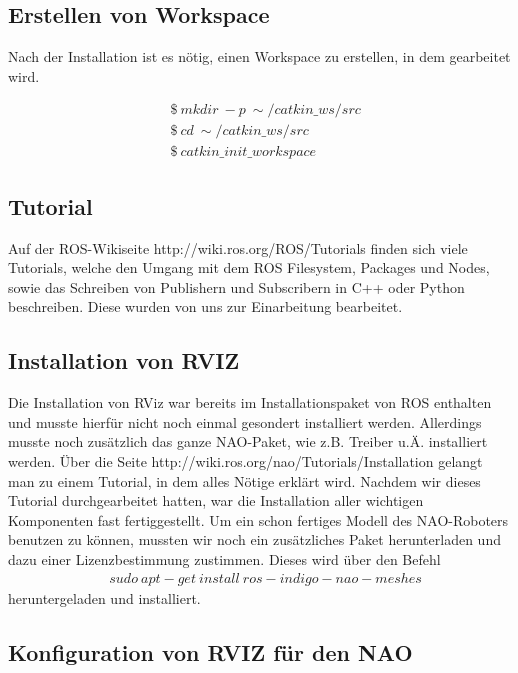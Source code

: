 \documentclass{scrartcl}
\begin{document}
\subsection{Erstellen von Workspace}

Nach der Installation ist es nötig, einen Workspace zu erstellen, in dem gearbeitet wird.

\begin{align}
&\$\ mkdir\ -p\ \sim/catkin\_ws/src\\
&\$\ cd\ \sim/catkin\_ws/src\\
&\$\ catkin\_init\_workspace
\end{align}

\subsection{Tutorial}

Auf der ROS-Wikiseite http://wiki.ros.org/ROS/Tutorials finden sich viele Tutorials, welche den Umgang mit dem ROS Filesystem, Packages und Nodes, sowie das Schreiben von Publishern und Subscribern in C++ oder Python beschreiben.
Diese wurden von uns zur Einarbeitung bearbeitet.

\subsection{Installation von RVIZ}

Die Installation von RViz war bereits im Installationspaket von ROS enthalten und musste hierfür nicht noch einmal gesondert installiert werden. Allerdings musste noch zusätzlich das ganze NAO-Paket, wie z.B. Treiber u.Ä. installiert werden. Über die Seite http://wiki.ros.org/nao/Tutorials/Installation gelangt man zu einem Tutorial, in dem alles Nötige erklärt wird. Nachdem wir dieses Tutorial durchgearbeitet hatten, war die Installation aller wichtigen Komponenten fast fertiggestellt. Um ein schon fertiges Modell des NAO-Roboters benutzen zu können, mussten wir noch ein zusätzliches Paket herunterladen und dazu einer Lizenzbestimmung zustimmen. Dieses wird über den Befehl
\begin{align}
&sudo\ apt-get\ install\ ros-indigo-nao-meshes
\end{align}
heruntergeladen und installiert.

\subsection{Konfiguration von RVIZ für den NAO}
\end{document}
